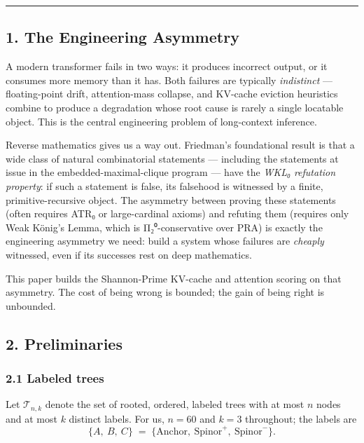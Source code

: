\documentclass[
  11pt,
]{article}
\begin{document}
\begin{center}\rule{0.5\linewidth}{0.5pt}\end{center}

\hypertarget{the-engineering-asymmetry}{%
\subsection{1. The Engineering
Asymmetry}\label{the-engineering-asymmetry}}

A modern transformer fails in two ways: it produces incorrect output, or
it consumes more memory than it has. Both failures are typically
\emph{indistinct} --- floating-point drift, attention-mass collapse, and
KV-cache eviction heuristics combine to produce a degradation whose root
cause is rarely a single locatable object. This is the central
engineering problem of long-context inference.

Reverse mathematics gives us a way out. Friedman's foundational result
is that a wide class of natural combinatorial statements --- including
the statements at issue in the embedded-maximal-clique program --- have
the \emph{WKL₀ refutation property}: if such a statement is false, its
falsehood is witnessed by a finite, primitive-recursive object. The
asymmetry between proving these statements (often requires ATR₀ or
large-cardinal axioms) and refuting them (requires only Weak König's
Lemma, which is Π₂⁰-conservative over PRA) is exactly the engineering
asymmetry we need: build a system whose failures are \emph{cheaply}
witnessed, even if its successes rest on deep mathematics.

This paper builds the Shannon-Prime KV-cache and attention scoring on
that asymmetry. The cost of being wrong is bounded; the gain of being
right is unbounded.

\hypertarget{preliminaries}{%
\subsection{2. Preliminaries}\label{preliminaries}}

\hypertarget{labeled-trees}{%
\subsubsection{2.1 Labeled trees}\label{labeled-trees}}

Let \(\mathcal{T}_{n,k}\) denote the set of rooted, ordered, labeled
trees with at most \(n\) nodes and at most \(k\) distinct labels. For
us, \(n = 60\) and \(k = 3\) throughout; the labels are
\[\{A,\ B,\ C\} \;=\; \{\text{Anchor},\ \text{Spinor}^+,\ \text{Spinor}^-\}.\]
\end{document}
